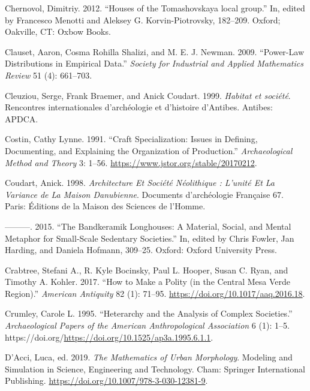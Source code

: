 \documentclass[
  12pt,
  a4paper, twoside]{book}
\newlength{\cslhangindent}
\newlength{\cslentryspacingunit} %
\newenvironment{CSLReferences}[2] %
 {%
  \setlength{\parindent}{0pt}
  \ifodd #1
  \let\oldpar\par
  \def\par{\hangindent=\cslhangindent\oldpar}
  \fi
  \setlength{\parskip}{#2\cslentryspacingunit}
 }%
 {}
\begin{document}
\begin{CSLReferences}{1}{0}
\leavevmode{}%
Chernovol, Dimitriy. 2012. {``Houses of the Tomashovskaya local group.''} In, edited by Francesco Menotti and Aleksey G. Korvin-Piotrovsky, 182--209. Oxford; Oakville, CT: Oxbow Books.

\leavevmode{}%
Clauset, Aaron, Cosma Rohilla Shalizi, and M. E. J. Newman. 2009. {``Power-Law Distributions in Empirical Data.''} \emph{Society for Industrial and Applied Mathematics Review} 51 (4): 661--703.

\leavevmode{}%
Cleuziou, Serge, Frank Braemer, and Anick Coudart. 1999. \emph{Habitat et société}. Rencontres internationales d'archéologie et d'histoire d'Antibes. Antibes: APDCA.

\leavevmode{}%
Costin, Cathy Lynne. 1991. {``Craft Specialization: Issues in Defining, Documenting, and Explaining the Organization of Production.''} \emph{Archaeological Method and Theory} 3: 1--56. \url{https://www.jstor.org/stable/20170212}.

\leavevmode{}%
Coudart, Anick. 1998. \emph{Architecture Et Société Néolithique : L'unité Et La Variance de La Maison Danubienne}. Documents d'archéologie Française 67. Paris: Éditions de la Maison des Sciences de l'Homme.

\leavevmode{}%
---------. 2015. {``The Bandkeramik Longhouses: A Material, Social, and Mental Metaphor for Small-Scale Sedentary Societies.''} In, edited by Chris Fowler, Jan Harding, and Daniela Hofmann, 309--25. Oxford: Oxford University Press.

\leavevmode{}%
Crabtree, Stefani A., R. Kyle Bocinsky, Paul L. Hooper, Susan C. Ryan, and Timothy A. Kohler. 2017. {``How to Make a Polity (in the Central Mesa Verde Region).''} \emph{American Antiquity} 82 (1): 71--95. \url{https://doi.org/10.1017/aaq.2016.18}.

\leavevmode{}%
Crumley, Carole L. 1995. {``Heterarchy and the Analysis of Complex Societies.''} \emph{Archaeological Papers of the American Anthropological Association} 6 (1): 1--5. https://doi.org/\url{https://doi.org/10.1525/ap3a.1995.6.1.1}.

\leavevmode{}%
D'Acci, Luca, ed. 2019. \emph{The Mathematics of Urban Morphology}. Modeling and Simulation in Science, Engineering and Technology. Cham: Springer International Publishing. \url{https://doi.org/10.1007/978-3-030-12381-9}.


\end{CSLReferences}
\end{document}
